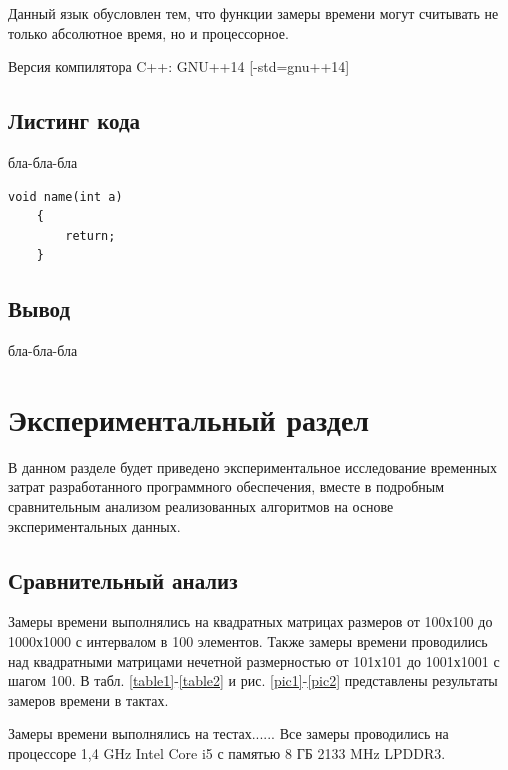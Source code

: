 \documentclass[12pt, a4paper]{report}
\begin{document}
	\vspace{0.2cm}Данный язык обусловлен тем, что функции замеры времени могут считывать не только абсолютное время, но и процессорное.
	
	\vspace{0.2cm}Версия компилятора C++: GNU++14 [-std=gnu++14]
	
	
	
	\section{Листинг кода}
	бла-бла-бла

	\begin{lstlisting}[label=code-opt,caption=бла-бла-бла]
	void name(int a)
	{
		return;
	}
	\end{lstlisting}

	\newpage

	\section{Вывод}
	бла-бла-бла

			
	\chapter{Экспериментальный раздел}
	
	\vspace{-0.6cm}\hspace{0.5cm}В данном разделе будет приведено экспериментальное исследование временных затрат разработанного программного обеспечения, вместе в подробным сравнительным анализом реализованных алгоритмов на основе экспериментальных данных.
	
	\section{Сравнительный анализ}
	
	\hspace{0.6cm}Замеры времени выполнялись на квадратных матрицах размеров от 100х100 до 1000х1000 с интервалом в 100 элементов. Также замеры времени проводились над квадратными матрицами нечетной размерностью  от 101х101 до 1001х1001 с шагом 100. В табл. \ref{table1}-\ref{table2} и рис. \ref{pic1}-\ref{pic2} представлены результаты замеров времени в тактах.
	
	\vspace{0.3cm}Замеры времени выполнялись на тестах...... Все замеры проводились на процессоре 1,4 GHz Intel Core i5 с памятью 8 ГБ 2133 MHz LPDDR3.
	
\end{document}
